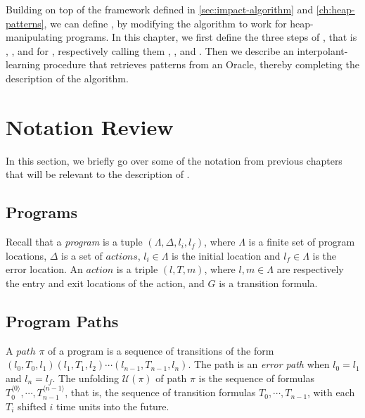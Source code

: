 
\label{ch:heap-impact-algorithm}
%

Building on top of the framework defined in \autoref{sec:impact-algorithm} and
\autoref{ch:heap-patterns}, we can define \verifier, by modifying the \impact algorithm to
work for heap-manipulating programs. In this chapter, we first define the three steps
of \impact, that is \expand, \cover, and  for \verifier, respectively calling
them \expandp, \coverp, and . Then we describe an interpolant-learning procedure
that retrieves patterns from an Oracle, thereby completing the description of the
algorithm.

\section{Notation Review}
In this section, we briefly go over some of the notation from previous chapters that will
be relevant to the description of \verifier.

\subsection{Programs}
Recall that a \textit{program} is a tuple $(\Lambda, \Delta, l_i, l_f)$, where $\Lambda$
is a finite set of program locations, $\Delta$ is a set of $actions$, $l_i \in \Lambda$ is
the initial location and $l_f \in \Lambda$ is the error location. An $action$ is a triple
$(l, T, m)$, where $l,m \in \Lambda$ are respectively the entry and exit locations of the
action, and $G$ is a transition formula.

\subsection{Program Paths}
A $path$ $\pi$ of a program is a sequence of transitions of the form
$(l_0, T_0, l_1)(l_1, T_1, l_2) \cdots (l_{n-1}, T_{n-1}, l_n)$. The path is an
\textit{error path} when $l_0 = l_1$ and $l_n = l_f$. The unfolding $\mathcal{U}(\pi)$ of
path $\pi$ is the sequence of formulas
$T_0^{\langle 0 \rangle}, \cdots, T_{n-1}^{\langle n-1 \rangle}$, that is, the sequence of
transition formulas $T_0, \cdots, T_{n-1}$, with each $T_i$ shifted $i$ time units into
the future.

